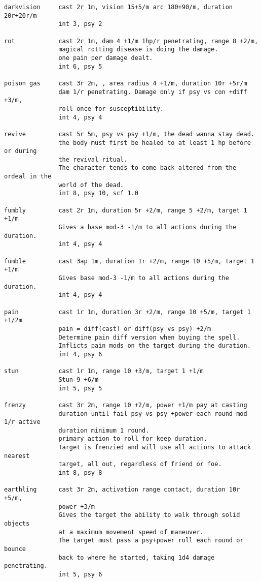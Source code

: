 \begin{verbatim}
darkvision     cast 2r 1m, vision 15+5/m arc 180+90/m, duration 20r+20r/m
               int 3, psy 2

rot            cast 2r 1m, dam 4 +1/m 1hp/r penetrating, range 8 +2/m,
               magical rotting disease is doing the damage.
               one pain per damage dealt.
               int 6, psy 5

poison gas     cast 3r 2m, , area radius 4 +1/m, duration 10r +5r/m
               dam 1/r penetrating. Damage only if psy vs con +diff +3/m,
               roll once for susceptibility.
               int 4, psy 4

revive         cast 5r 5m, psy vs psy +1/m, the dead wanna stay dead.
               the body must first be healed to at least 1 hp before or during
               the revival ritual.
               The character tends to come back altered from the ordeal in the
               world of the dead.
               int 8, psy 10, scf 1.0

fumbly         cast 2r 1m, duration 5r +2/m, range 5 +2/m, target 1 +1/m
               Gives a base mod-3 -1/m to all actions during the duration.
               int 4, psy 4

fumble         cast 3ap 1m, duration 1r +2/m, range 10 +5/m, target 1 +1/m
               Gives base mod-3 -1/m to all actions during the duration.
               int 4, psy 4

pain           cast 1r 1m, duration 3r +2/m, range 10 +5/m, target 1 +1/2m
               pain = diff(cast) or diff(psy vs psy) +2/m
               Determine pain diff version when buying the spell.
               Inflicts pain mods on the target during the duration.
               int 4, psy 6

stun           cast 1r 1m, range 10 +3/m, target 1 +1/m
               Stun 9 +6/m
               int 5, psy 5

frenzy         cast 3r 2m, range 10 +2/m, power +1/m pay at casting
               duration until fail psy vs psy +power each round mod-1/r active
               duration minimum 1 round.
               primary action to roll for keep duration.
               Target is frenzied and will use all actions to attack nearest
               target, all out, regardless of friend or foe.
               int 8, psy 8

earthling      cast 3r 2m, activation range contact, duration 10r +5/m,
               power +3/m
               Gives the target the ability to walk through solid objects
               at a maximum movement speed of maneuver.
               The target must pass a psy+power roll each round or bounce
               back to where he started, taking 1d4 damage penetrating.
               int 5, psy 6


\end{verbatim}
